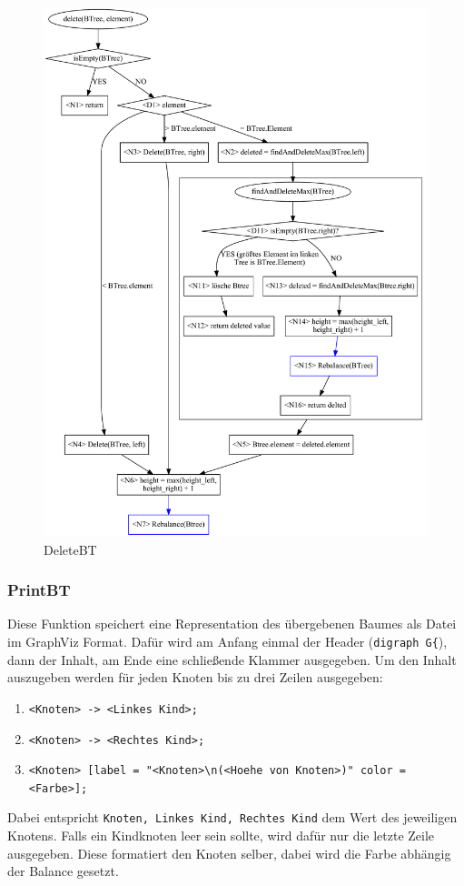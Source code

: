 \begin{figure}[p]
    \centering
    \includegraphics[height= 0.97\textheight]{img/gv/delete}
    \caption{DeleteBT}
    \label{fig:AVL-delete}
\end{figure}

\subsubsection{PrintBT}\label{par:printBT}
Diese Funktion speichert eine Representation des übergebenen Baumes als Datei im GraphViz Format.
Dafür wird am Anfang einmal der Header (\verb|digraph G{|), dann der Inhalt, am Ende eine
schließende Klammer ausgegeben.
Um den Inhalt auszugeben werden für jeden Knoten bis zu drei Zeilen ausgegeben:
\begin{enumerate}
    \item \verb|<Knoten> -> <Linkes Kind>;|
    \item \verb|<Knoten> -> <Rechtes Kind>;|
    \item \verb|<Knoten> [label = "<Knoten>\n(<Hoehe von Knoten>)" color = <Farbe>];|
\end{enumerate}
Dabei entspricht \verb|Knoten, Linkes Kind, Rechtes Kind| dem Wert des jeweiligen Knotens.
Falls ein Kindknoten leer sein sollte, wird dafür nur die letzte Zeile ausgegeben.
Diese formatiert den Knoten selber, dabei wird die Farbe abhängig der Balance gesetzt.

